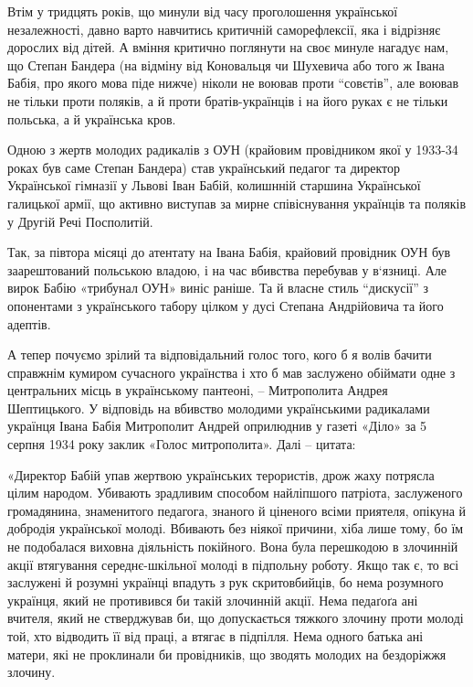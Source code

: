 Втім у тридцять років, що минули від часу проголошення української
незалежності, давно варто навчитись критичній саморефлексії, яка і відрізняє
дорослих від дітей. А вміння критично поглянути на своє минуле нагадує нам, що
Степан Бандера (на відміну від Коновальця чи Шухевича або того ж Івана Бабія,
про якого мова піде нижче) ніколи не воював проти \enquote{совєтів}, але воював не
тільки проти поляків, а й проти братів-українців і на його руках є не тільки
польська, а й українська кров.

Одною з жертв молодих радикалів з ОУН (крайовим провідником якої у 1933-34
роках був саме Степан Бандера) став український педагог та директор Української
гімназії у Львові Іван Бабій, колишнній  старшина Української галицької армії,
що активно виступав за мирне співіснування українців та поляків у Другій  Речі
Посполитій.

Так, за півтора місяці до атентату на Івана Бабія, крайовий провідник ОУН був
заарештований польською владою, і на час вбивства перебував у в‘язниці. Але
вирок Бабію «трибунал ОУН» виніс раніше. Та й власне стиль \enquote{дискусії} з
опонентами з українського табору цілком у дусі Степана Андрійовича та його
адептів.

А тепер почуємо зрілий та відповідальний голос того, кого б я волів бачити
справжнім кумиром сучасного українства і хто б мав заслужено обіймати одне з
центральних місць в українському пантеоні, – Митрополита Андрея Шептицького. У
відповідь на вбивство молодими українськими радикалами українця Івана Бабія
Митрополит Андрей оприлюднив у газеті «Діло» за 5 серпня 1934 року заклик
«Голос митрополита». Далі – цитата:

«Директор Бабій упав жертвою українських терористів, дрож жаху потрясла цілим
народом. Убивають зрадливим способом найліпшого патріота, заслуженого
громадянина, знаменитого педагога, знаного й ціненого всіми приятеля, опікуна й
добродія української молоді. Вбивають без ніякої причини, хіба лише тому, бо їм
не подобалася виховна діяльність покійного. Вона була перешкодою в злочинній
акції втягування середнє-шкільної молоді в підпольну роботу. Якщо так є, то всі
заслужені й розумні українці впадуть з рук скритовбийців, бо нема розумного
українця, який не противився би такій злочинній акції. Нема педаґоґа ані
вчителя, який не стверджував би, що допускається тяжкого злочину проти молоді
той, хто відводить її від праці, а втягає в підпілля. Нема одного батька ані
матери, які не проклинали би провідників, що зводять молодих на бездоріжжя
злочину.

